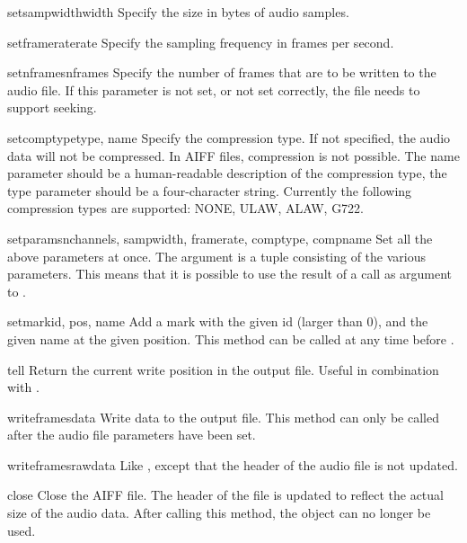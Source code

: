 \begin{methoddesc}[aifc]{setsampwidth}{width}
Specify the size in bytes of audio samples.
\end{methoddesc}

\begin{methoddesc}[aifc]{setframerate}{rate}
Specify the sampling frequency in frames per second.
\end{methoddesc}

\begin{methoddesc}[aifc]{setnframes}{nframes}
Specify the number of frames that are to be written to the audio file.
If this parameter is not set, or not set correctly, the file needs to
support seeking.
\end{methoddesc}

\begin{methoddesc}[aifc]{setcomptype}{type, name}
Specify the compression type.  If not specified, the audio data will
not be compressed.  In AIFF files, compression is not possible.  The
name parameter should be a human-readable description of the
compression type, the type parameter should be a four-character
string.  Currently the following compression types are supported:
NONE, ULAW, ALAW, G722.
\end{methoddesc}

\begin{methoddesc}[aifc]{setparams}{nchannels, sampwidth, framerate, comptype, compname}
Set all the above parameters at once.  The argument is a tuple
consisting of the various parameters.  This means that it is possible
to use the result of a  call as argument to
.
\end{methoddesc}

\begin{methoddesc}[aifc]{setmark}{id, pos, name}
Add a mark with the given id (larger than 0), and the given name at
the given position.  This method can be called at any time before
.
\end{methoddesc}

\begin{methoddesc}[aifc]{tell}{}
Return the current write position in the output file.  Useful in
combination with .
\end{methoddesc}

\begin{methoddesc}[aifc]{writeframes}{data}
Write data to the output file.  This method can only be called after
the audio file parameters have been set.
\end{methoddesc}

\begin{methoddesc}[aifc]{writeframesraw}{data}
Like , except that the header of the audio file
is not updated.
\end{methoddesc}

\begin{methoddesc}[aifc]{close}{}
Close the AIFF file.  The header of the file is updated to reflect the
actual size of the audio data. After calling this method, the object
can no longer be used.
\end{methoddesc}
